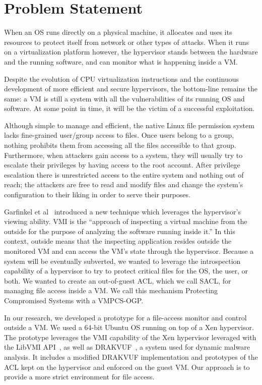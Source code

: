 \section{Problem Statement}\label{sec:problem} 
When an \ac{OS} runs directly on a physical machine, it allocates and uses its resources to protect itself from network or other types of attacks. When it runs on a virtualization platform however, the hypervisor stands between the hardware and the running software, and can monitor what is happening inside a \ac{VM}. 

\par Despite the evolution of \ac{CPU} virtualization instructions and the continuous development of more efficient and secure hypervisors, the bottom-line remains the same: a \ac{VM} is still a system with all the vulnerabilities of its running \ac{OS} and software. At some point in time, it will be the victim of a successful exploitation. 

\par Although simple to manage and efficient, the native Linux file permission system lacks fine-grained user/group access to files. Once users belong to a group, nothing prohibits them from accessing all the files accessible to that group. Furthermore, when attackers gain access to a system, they will usually try to escalate their privileges by having access to the root account. After privilege escalation there is unrestricted access to the entire system and nothing out of reach; the attackers are free to read and modify files and change the system's configuration to their liking in order to serve their purposes.

\par Garfinkel et al~\cite{garfinkel2003virtual} introduced a new technique which leverages the hypervisor's viewing ability. \ac{VMI} is the “approach of inspecting a virtual machine from the outside for the purpose of analyzing the software running inside it.” In this context, outside means that the inspecting application resides outside the monitored \ac{VM} and can access the \ac{VM}'s state through the hypervisor. Because a system will be eventually subverted, we wanted to leverage the introspection capability of a hypervisor to try to protect critical files for the OS, the user, or both. We wanted to create an out-of-guest \ac{ACL}, which we call \ac{SACL}, for managing file access inside a VM. We call this mechanism Protecting Compromised Systems with a \ac{VMPCS-OGP}.

\par In our research, we developed a prototype for a file-access monitor and control outside a \ac{VM}. We used a 64-bit Ubuntu OS running on top of a Xen hypervisor. The prototype leverages the \ac{VMI} capability of the Xen hypervisor leveraged with the LibVMI \ac{API}~\cite{payne2011libvmi}, as well as DRAKVUF~\cite{lengyel2014drakvuf}, a system used for dynamic malware analysis. It includes a modified DRAKVUF implementation and prototypes of the \ac{ACL} kept on the hypervisor and enforced on the guest \ac{VM}. Our approach is to provide a more strict environment for file access.

